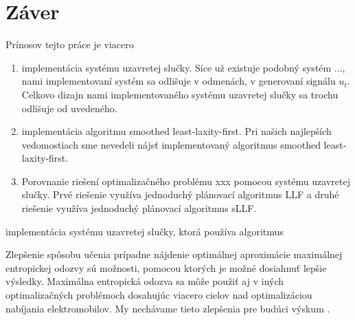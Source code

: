 \chapter*{Záver}  %

Prínosov  tejto práce je viacero 
\begin{enumerate}
    \item implementácia systému uzavretej slučky. Síce už existuje podobný systém ..., nami implementovaní systém sa odlišuje v odmenách, v generovaní signálu $u_{t}$. Celkovo dizajn nami implementovaného systému uzavretej slučky sa trochu odlišuje od uvedeného.
    \item implementácia algoritmu smoothed least-laxity-first. Pri našich najlepších vedomostiach sme nevedeli nájsť implementovaný algoritmus smoothed least-laxity-first.
    \item Porovnanie riešení optimalizačného problému xxx pomocou systému uzavretej slučky. Prvé riešenie využíva jednoduchý plánovací algoritmus LLF a druhé riešenie využíva jednoduchý plánovací algoritmus sLLF.
\end{enumerate}

implementácia systému uzavretej slučky, ktorá používa algoritmus 


Zlepšenie spôsobu učenia prípadne nájdenie optimálnej aproximácie maximálnej entropickej odozvy sú možnosti, pomocou ktorých je možné dosiahnuť lepšie výsledky. Maximálna entropická odozva sa môže použiť aj v iných  optimalizačných problémoch dosahujúc viacero cielov nad optimalizáciou nabíjania elektromobilov. My nechávame tieto zlepšenia pre budúci výskum \cite{Li_2021,Li_information_aggregation}.